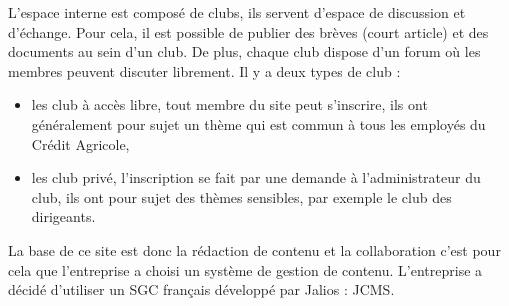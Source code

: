 \documentclass[12pt,a4paper]{article}
\begin{document}
L'espace interne est composé de clubs, ils servent d'espace de discussion et d'échange. Pour cela, il est possible de publier des brèves (court article) et des documents au sein d'un club. De plus, chaque club dispose d'un forum où les membres peuvent discuter librement. Il y a deux types de club : 
\begin{itemize}
\item les club à accès libre, tout membre du site peut s'inscrire, ils ont généralement pour sujet un thème qui est commun à tous les employés du Crédit Agricole,
\item les club privé, l'inscription se fait par une demande à l'administrateur du club, ils ont pour sujet des thèmes sensibles, par exemple le club des dirigeants.
\end{itemize} \par 
\bigskip
La base de ce site est donc la rédaction de contenu et la collaboration c'est pour cela que l'entreprise a choisi un système de gestion de contenu. L'entreprise a décidé d'utiliser un SGC français développé par Jalios : \gls{JCMS}.
\end{document}
